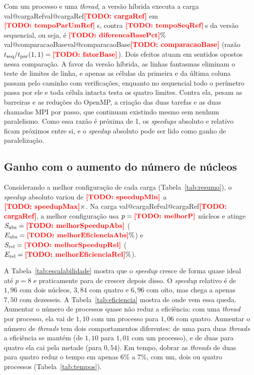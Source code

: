 \documentclass[11pt,a4paper]{article}
\makeatletter
\newcommand{\TODO}[1]{\textcolor{red}{\textbf{[TODO: #1]}}}
\newcommand{\pct}{\%}
\newcommand{\Valor}[1]{\ifcsname val@#1\endcsname\csname val@#1\endcsname\else\TODO{#1}\fi}
\makeatother
\begin{document}
Com um processo e uma \emph{thread}, a versão híbrida executa a carga \Valor{cargaRef} em $\Valor{tempoParUmRef}$\,s, contra $\Valor{tempoSeqRef}$\,s da versão sequencial, ou seja, é $\Valor{diferencaBasePct}\pct$ \Valor{comparacaoBase} (razão $t_\text{seq}/t_\text{par}(1,1) = \Valor{fatorBase}$). Dois efeitos atuam em sentidos opostos nessa comparação. A favor da versão híbrida, as linhas fantasmas eliminam o teste de limites de linha, e apenas as células da primeira e da última coluna passam pelo caminho com verificações, enquanto no sequencial todo o perímetro passa por ele e toda célula intacta testa os quatro limites. Contra ela, pesam as barreiras e as reduções do OpenMP, a criação das duas tarefas e as duas chamadas MPI por passo, que continuam existindo mesmo sem nenhum paralelismo. Como essa razão é próxima de 1, os \emph{speedups} absoluto e relativo ficam próximos entre si, e o \emph{speedup} absoluto pode ser lido como ganho de paralelização.

\subsection{Ganho com o aumento do número de núcleos}

Considerando a melhor configuração de cada carga (Tabela~\ref{tab:resumo}), o \emph{speedup} absoluto variou de $\Valor{speedupMin}$ a $\Valor{speedupMax}\times$. Na carga \Valor{cargaRef}, a melhor configuração usa $p = \Valor{melhorP}$ núcleos e atinge $S_\text{abs} = \Valor{melhorSpeedupAbs}$ ($E_\text{abs} = \Valor{melhorEficienciaAbs}\pct$) e $S_\text{rel} = \Valor{melhorSpeedupRel}$ ($E_\text{rel} = \Valor{melhorEficienciaRel}\pct$).

A Tabela~\ref{tab:escalabilidade} mostra que o \emph{speedup} cresce de forma quase ideal até $p = 8$ e praticamente para de crescer depois disso. O \emph{speedup} relativo é de $1{,}96$ com dois núcleos, $3{,}84$ com quatro e $6{,}96$ com oito, mas chega a apenas $7{,}50$ com dezesseis. A Tabela~\ref{tab:eficiencia} mostra de onde vem essa queda. Aumentar o número de processos quase não reduz a eficiência: com uma \emph{thread} por processo, ela vai de $1{,}10$ com um processo para $1{,}06$ com quatro. Aumentar o número de \emph{threads} tem dois comportamentos diferentes: de uma para duas \emph{threads} a eficiência se mantém (de $1{,}10$ para $1{,}01$ com um processo), e de duas para quatro ela cai pela metade (para $0{,}54$). Em tempo, dobrar as \emph{threads} de duas para quatro reduz o tempo em apenas 6\pct{} a 7\pct{}, com um, dois ou quatro processos (Tabela~\ref{tab:tempos}).
\end{document}
